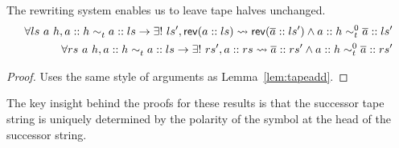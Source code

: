 \documentclass[a4paper,UKenglish,cleveref, autoref]{lipics-v2019}
\newcommand{\strent}{\rightsquigarrow}
\begin{document}
\begin{lemma}\label{lem:tapeid}
  The rewriting system enables us to leave tape halves unchanged. 
  \begin{align*}
    \forall ls~a~h, a :: h \reprt{} a :: ls \rightarrow \exists !~ls', \rev{(a::ls)} \strent{} \rev{(\polneut{a} :: ls')} \land a :: h \reprt{0} \polneut{a} :: ls'\\
    \forall rs~a~h, a :: h \reprt{} a :: ls \rightarrow \exists !~rs', a :: rs \strent{} \polneut{a} :: rs' \land a :: h \reprt{0} \polneut{a} :: rs'
  \end{align*}
\end{lemma}
\begin{proof}
  Uses the same style of arguments as Lemma~\ref{lem:tapeadd}.
\end{proof}

The key insight behind the proofs for these results is that the successor tape string is uniquely determined by the polarity of the symbol at the head of the successor string. 
\end{document}
